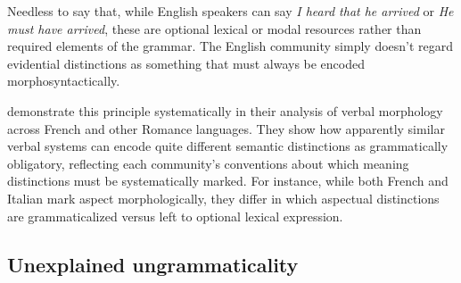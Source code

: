 Needless to say that, while English speakers can say \textit{I heard that he arrived} or \textit{He must have arrived}, these are optional lexical or modal resources rather than required elements of the grammar. The English community simply doesn't regard evidential distinctions as something that must always be encoded morphosyntactically.

\textcite{kilani2005} demonstrate this principle systematically in their analysis of verbal morphology across French and other Romance languages. They show how apparently similar verbal systems can encode quite different semantic distinctions as grammatically obligatory, reflecting each community's conventions about which meaning distinctions must be systematically marked. For instance, while both French and Italian mark aspect morphologically, they differ in which aspectual distinctions are grammaticalized versus left to optional lexical expression.

\subsection{Unexplained ungrammaticality}\label{sec:systematic-blocking}

